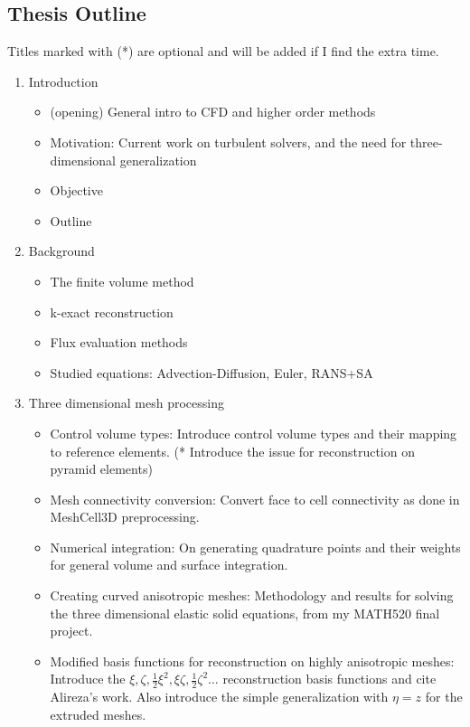 %
\subsection*{Thesis Outline}
Titles marked with (*) are optional and will be added if I find the
extra time.

\begin{enumerate}
  
\item Introduction
  \begin{itemize}
  \item (opening) General intro to CFD and higher order methods
  \item Motivation: Current work on turbulent solvers, and the need for
    three-dimensional generalization
  \item Objective
  \item Outline
  \end{itemize}
  
\item Background
  \begin{itemize}
  \item The finite volume method
  \item k-exact reconstruction
  \item Flux evaluation methods
  \item Studied equations: Advection-Diffusion, Euler, RANS+SA
  \end{itemize}
  
\item Three dimensional mesh processing
  \begin{itemize}
  \item Control volume types: Introduce control volume types and their
    mapping to reference elements. (* Introduce the issue for
    reconstruction on pyramid elements)
  \item Mesh connectivity conversion: Convert face to cell
    connectivity as done in MeshCell3D preprocessing.
  \item Numerical integration: On generating quadrature points and
    their weights for general volume and surface integration.
  \item Creating curved anisotropic meshes: Methodology and results
    for solving the three dimensional elastic solid equations, from my
    MATH520 final project.
  \item Modified basis functions for reconstruction on highly
    anisotropic meshes: Introduce the $\xi, \zeta, \frac{1}{2}\xi^2,
    \xi\zeta, \frac{1}{2}\zeta^2\ldots$ reconstruction basis functions
    and cite Alireza's work. Also introduce the simple
    generalization with $\eta=z$ for the extruded meshes.
  \end{itemize}
  

\end{enumerate}
